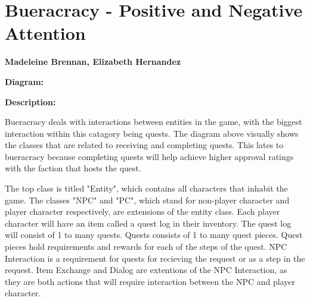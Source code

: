 \documentclass{report}
\begin{document}
\chapter{Bueracracy - Positive and Negative Attention}
\textbf{Madeleine Brennan, Elizabeth Hernandez}

\textbf{Diagram:}

\textbf{Description:}

Bueracracy deals with interactions between entities in the game, with the biggest interaction within this catagory being quests. The diagram above visually shows the classes that are related to receiving and completing quests. This lates to bueracracy because completing quests will help achieve higher approval ratings with the faction that hosts the quest.

The top class is titled "Entity", which contains all characters that inhabit the game. 
The classes "NPC" and "PC", which stand for non-player character and player character respectively, are extensions of the entity class. 
Each player character will have an item called a quest log in their inventory. 
The quest log will consist of 1 to many quests.
Quests consists of 1 to many quest pieces.
Quest pieces hold requirements and rewards for each of the steps of the quest.
NPC Interaction is a requirement for quests for recieving the request or as a step in the request.
Item Exchange and Dialog are extentions of the NPC Interaction, as they are both actions that will require interaction between the NPC and player character.
\end{document}
